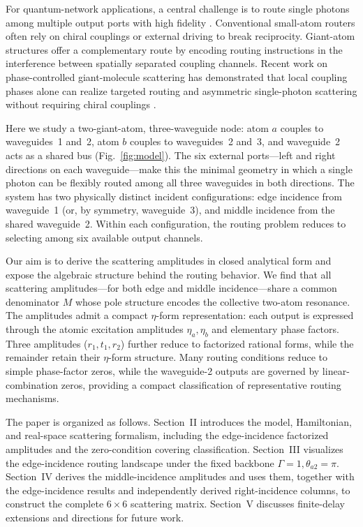 \documentclass[aps,pra,reprint,superscriptaddress,nofootinbib,longbibliography,floatfix]{revtex4-2}
\begin{document}
For quantum-network applications, a central challenge is to route single photons among multiple output ports with high fidelity \cite{Zhou2008SinglePhotonRouter}.
Conventional small-atom routers often rely on chiral couplings or external driving to break reciprocity.
Giant-atom structures offer a complementary route by encoding routing instructions in the interference between spatially separated coupling channels.
Recent work on phase-controlled giant-molecule scattering has demonstrated that local coupling phases alone can realize targeted routing and asymmetric single-photon scattering without requiring chiral couplings \cite{Sun2025PhaseControlled}.

Here we study a two-giant-atom, three-waveguide node: atom $a$ couples to waveguides~1 and~2, atom $b$ couples to waveguides~2 and~3, and waveguide~2 acts as a shared bus (Fig.~\ref{fig:model}).
The six external ports---left and right directions on each waveguide---make this the minimal geometry in which a single photon can be flexibly routed among all three waveguides in both directions.
The system has two physically distinct incident configurations: edge incidence from waveguide~1 (or, by symmetry, waveguide~3), and middle incidence from the shared waveguide~2.
Within each configuration, the routing problem reduces to selecting among six available output channels.

Our aim is to derive the scattering amplitudes in closed analytical form and expose the algebraic structure behind the routing behavior.
We find that all scattering amplitudes---for both edge and middle incidence---share a common denominator $M$ whose pole structure encodes the collective two-atom resonance.
The amplitudes admit a compact $\eta$-form representation: each output is expressed through the atomic excitation amplitudes $\eta_a,\eta_b$ and elementary phase factors.
Three amplitudes ($r_1,t_1,r_2$) further reduce to factorized rational forms, while the remainder retain their $\eta$-form structure.
Many routing conditions reduce to simple phase-factor zeros, while the waveguide-2 outputs are governed by linear-combination zeros, providing a compact classification of representative routing mechanisms.

The paper is organized as follows.
Section~II introduces the model, Hamiltonian, and real-space scattering formalism, including the edge-incidence factorized amplitudes and the zero-condition covering classification.
Section~III visualizes the edge-incidence routing landscape under the fixed backbone $\Gamma=1,\theta_{a2}=\pi$.
Section~IV derives the middle-incidence amplitudes and uses them, together with the edge-incidence results and independently derived right-incidence columns, to construct the complete $6\times6$ scattering matrix.
Section~V discusses finite-delay extensions and directions for future work.
\end{document}
